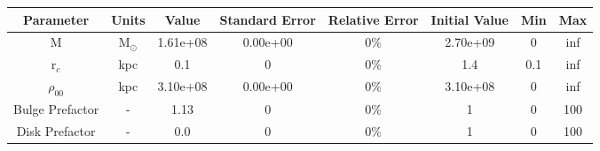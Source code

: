 \begin{tabular}[c]{| c | c | c | c | c | c | c | c |} 
\hline 
    \textbf{Parameter} & \textbf{Units} & \textbf{Value} & \textbf{Standard Error} & \textbf{Relative Error} & \textbf{Initial Value} & \textbf{Min} & \textbf{Max} \\ \hline 
    M & M$_\odot$ & 1.61e+08 & 0.00e+00 & 0\% & 2.70e+09 & 0 & inf \\ \hline 
    r$_c$ & kpc & 0.1 & 0 & 0\% & 1.4 & 0.1 & inf \\ \hline 
    $\rho_{00}$ & kpc & 3.10e+08 & 0.00e+00 & 0\% & 3.10e+08 & 0 & inf \\ \hline 
    Bulge Prefactor & - & 1.13 & 0 & 0\% & 1 & 0 & 100 \\ \hline 
    Disk Prefactor & - & 0.0 & 0 & 0\% & 1 & 0 & 100 \\ \hline 
\end{tabular} 
